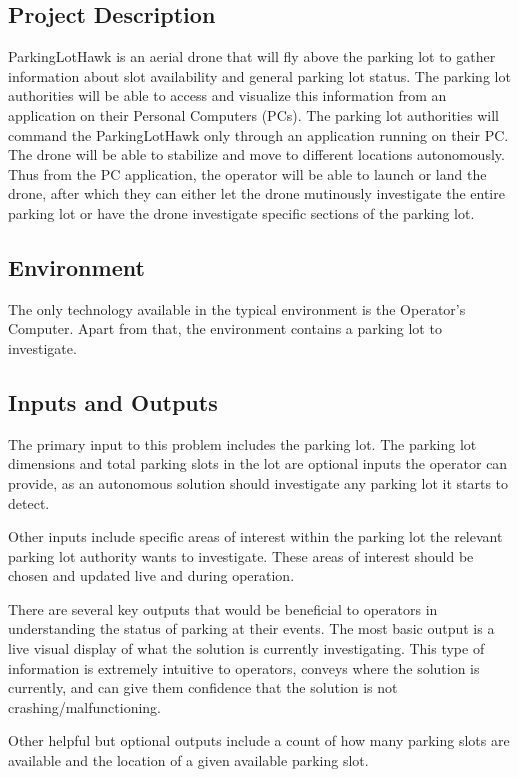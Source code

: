 \documentclass{article}
\begin{document}
\subsection{Project Description}

ParkingLotHawk is an aerial drone that will fly above the parking lot to gather information about slot availability and general parking lot status. The parking lot authorities will be able to access and visualize this information from an application on their Personal Computers (PCs). The parking lot authorities will command the ParkingLotHawk  only through an application running on their PC. The drone will be able to stabilize and move to different locations autonomously. Thus from the PC application, the operator will be able to launch or land the drone, after which they can either let the drone mutinously investigate the entire parking lot or have the drone investigate specific sections of the parking lot. 

\subsection{Environment}
The only technology available in the typical environment is the Operator's Computer. Apart from that, the environment contains a parking lot to investigate. 

\subsection{Inputs and Outputs}

The primary input to this problem includes the parking lot. The parking lot dimensions and total parking slots in the lot are optional inputs the operator can provide, as an autonomous solution should investigate any parking lot it starts to detect. 

Other inputs include specific areas of interest within the parking lot the relevant parking lot authority wants to investigate. These areas of interest should be chosen and updated live and during operation. 

There are several key outputs that would be beneficial to operators in understanding the status of parking at their events. The most basic output is a live visual display of what the solution is currently investigating. This type of information is extremely intuitive to operators, conveys where the solution is currently, and can give them confidence that the solution is not crashing/malfunctioning.  

Other helpful but optional outputs include a count of how many parking slots are available and the location of a given available parking slot.
\end{document}

